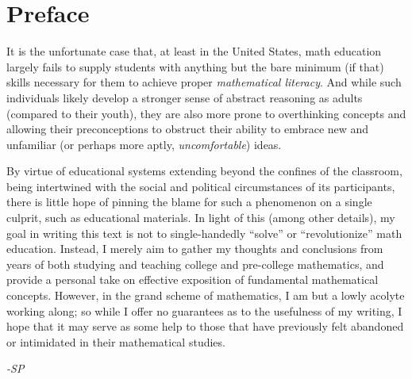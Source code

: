 \chapter*{Preface}

It is the unfortunate case that, at least in the United States, math education
largely fails to supply students with anything but the bare minimum (if that)
skills necessary for them to achieve proper \textit{mathematical literacy}.
And while such individuals likely develop a stronger sense of abstract reasoning
as adults (compared to their youth), they are also more prone to overthinking
concepts and allowing their preconceptions to obstruct their ability to embrace
new and unfamiliar (or perhaps more aptly, \textit{uncomfortable}) ideas.

By virtue of educational systems extending beyond the confines of the classroom,
being intertwined with the social and political circumstances of its participants,
there is little hope of pinning the blame for such a phenomenon on a single
culprit, such as educational materials.
In light of this (among other details), my goal in writing this text is not to
single-handedly ``solve'' or ``revolutionize'' math education.
Instead, I merely aim to gather my thoughts and conclusions from years of both
studying and teaching college and pre-college mathematics, and provide a personal
take on effective exposition of fundamental mathematical concepts.
However, in the grand scheme of mathematics, I am but a lowly acolyte working
along; so while I offer no guarantees as to the usefulness of my writing, I hope
that it may serve as some help to those that have previously felt abandoned or
intimidated in their mathematical studies.

\flushright
\textit{-SP}
\flushleft
